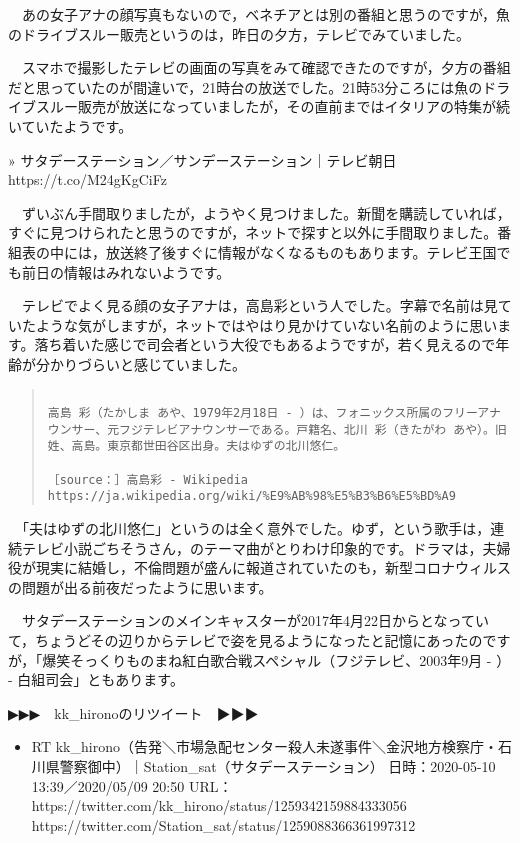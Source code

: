 \documentclass[]{ltjarticle}
\providecommand{\tightlist}{%
  \setlength{\itemsep}{0pt}\setlength{\parskip}{0pt}}
\begin{document}
　あの女子アナの顔写真もないので，ベネチアとは別の番組と思うのですが，魚のドライブスルー販売というのは，昨日の夕方，テレビでみていました。

　スマホで撮影したテレビの画面の写真をみて確認できたのですが，夕方の番組だと思っていたのが間違いで，21時台の放送でした。21時53分ころには魚のドライブスルー販売が放送になっていましたが，その直前まではイタリアの特集が続いていたようです。

» サタデーステーション／サンデーステーション｜テレビ朝日
https://t.co/M24gKgCiFz

　ずいぶん手間取りましたが，ようやく見つけました。新聞を購読していれば，すぐに見つけられたと思うのですが，ネットで探すと以外に手間取りました。番組表の中には，放送終了後すぐに情報がなくなるものもあります。テレビ王国でも前日の情報はみれないようです。

　テレビでよく見る顔の女子アナは，高島彩という人でした。字幕で名前は見ていたような気がしますが，ネットではやはり見かけていない名前のように思います。落ち着いた感じで司会者という大役でもあるようですが，若く見えるので年齢が分かりづらいと感じていました。

\begingroup\fontsize{9pt}{10pt}\selectfont
\begin{quote}
\begin{verbatim}

高島 彩（たかしま あや、1979年2月18日 - ）は、フォニックス所属のフリーアナウンサー、元フジテレビアナウンサーである。戸籍名、北川 彩（きたがわ あや）。旧姓、高島。東京都世田谷区出身。夫はゆずの北川悠仁。

［source：］高島彩 - Wikipedia https://ja.wikipedia.org/wiki/%E9%AB%98%E5%B3%B6%E5%BD%A9

\end{verbatim}
\end{quote}\endgroup


　「夫はゆずの北川悠仁」というのは全く意外でした。ゆず，という歌手は，連続テレビ小説ごちそうさん，のテーマ曲がとりわけ印象的です。ドラマは，夫婦役が現実に結婚し，不倫問題が盛んに報道されていたのも，新型コロナウィルスの問題が出る前夜だったように思います。

　サタデーステーションのメインキャスターが2017年4月22日からとなっていて，ちょうどその辺りからテレビで姿を見るようになったと記憶にあったのですが，「爆笑そっくりものまね紅白歌合戦スペシャル（フジテレビ、2003年9月
- ） - 白組司会」ともあります。

▶▶▶　kk\_hironoのリツイート　▶▶▶

\begin{itemize}
\tightlist
\item
  RT
  kk\_hirono（告発＼市場急配センター殺人未遂事件＼金沢地方検察庁・石川県警察御中）｜Station\_sat（サタデーステーション）
  日時：2020-05-10 13:39／2020/05/09 20:50 URL：
  https://twitter.com/kk\_hirono/status/1259342159884333056
  https://twitter.com/Station\_sat/status/1259088366361997312
\end{itemize}
\end{document}
